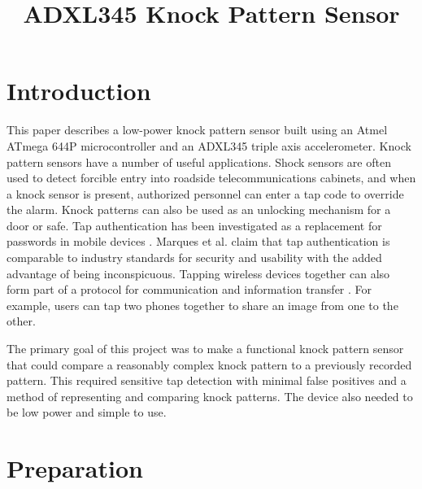 \documentclass[conference]{./IEEEtran}
\begin{document}
%
\title{ADXL345 Knock Pattern Sensor}


\author{
}

\maketitle


\section{Introduction}
This paper describes a low-power knock pattern sensor built using an Atmel ATmega 644P microcontroller and an ADXL345 triple axis accelerometer. Knock pattern sensors have a number of useful applications. Shock sensors are often used to detect forcible entry into roadside telecommunications cabinets, and when a knock sensor is present, authorized personnel can enter a tap code to override the alarm. Knock patterns can also be used as an unlocking mechanism for a door or safe. Tap authentication has been investigated as a replacement for passwords in mobile devices \cite{marques}. Marques et al. claim that tap authentication is comparable to industry standards for security and usability with the added advantage of being inconspicuous. Tapping wireless devices together can also form part of a protocol for communication and information transfer \cite{thorn}. For example, users can tap two phones together to share an image from one to the other.

The primary goal of this project was to make a functional knock pattern sensor that could compare a reasonably complex knock pattern to a previously recorded pattern. This required sensitive tap detection with minimal false positives and a method of representing and comparing knock patterns. The device also needed to be low power and simple to use. 

\section{Preparation}
\end{document}
